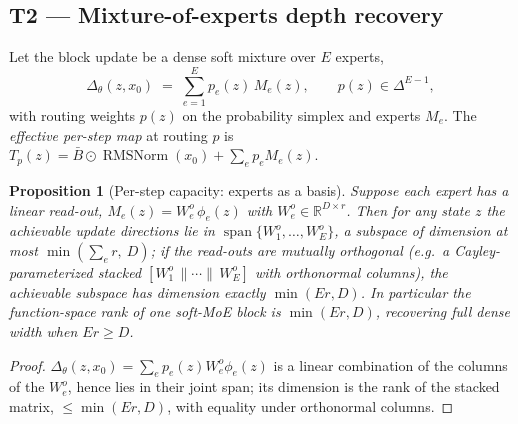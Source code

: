 \documentclass[11pt]{article}
\newtheorem{proposition}[theorem]{Proposition}
\newcommand{\R}{\mathbb{R}}
\newcommand{\simplex}{\Delta}
\newcommand{\RMSNorm}{\operatorname{RMSNorm}}
\newcommand{\spn}{\operatorname{span}}
\begin{document}
\subsection{T2 --- Mixture-of-experts depth recovery}
\label{sec:t2}

Let the block update be a dense soft mixture over $E$ experts,
\begin{equation}
  \Delta_\theta(z,x_0) \;=\; \sum_{e=1}^{E} p_e(z)\, M_e(z), \qquad p(z)\in\simplex^{E-1},
  \label{eq:mixture}
\end{equation}
with routing weights $p(z)$ on the probability simplex and experts $M_e$.  The
\emph{effective per-step map} at routing $p$ is $T_p(z) = \bar B\odot\RMSNorm(x_0) + \sum_e p_e M_e(z)$.

\begin{proposition}[Per-step capacity: experts as a basis]
\label{prop:rank}
Suppose each expert has a linear read-out, $M_e(z) = W^o_e\, \phi_e(z)$ with
$W^o_e\in\R^{D\times r}$.  Then for any state $z$ the achievable update directions lie in
$\spn\{W^o_1,\dots,W^o_E\}$, a subspace of dimension at most $\min(\sum_e r,\ D)$; if the
read-outs are mutually orthogonal (e.g.\ a Cayley-parameterized stacked
$[W^o_1\,\|\cdots\|\,W^o_E]$ with orthonormal columns), the achievable subspace has
dimension exactly $\min(Er, D)$.  In particular the function-space rank of one
soft-MoE block is $\min(Er, D)$, recovering full dense width when $Er\ge D$.
\end{proposition}

\begin{proof}
$\Delta_\theta(z,x_0)=\sum_e p_e(z) W^o_e \phi_e(z)$ is a linear combination of the
columns of the $W^o_e$, hence lies in their joint span; its dimension is the rank of the
stacked matrix, $\le\min(Er,D)$, with equality under orthonormal columns.
\end{proof}
\end{document}
